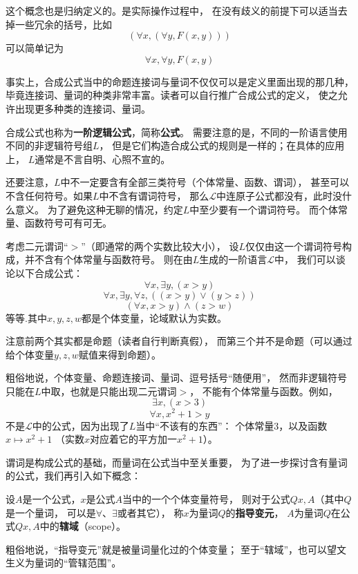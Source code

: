这个概念也是归纳定义的。是实际操作过程中，
在没有歧义的前提下可以适当去掉一些冗余的括号，比如
$$(\forall x,(\forall y,F(x,y)))$$
可以简单记为
$$\forall x,\forall y,F(x,y)$$

事实上，合成公式当中的命题连接词与量词不仅仅可以是定义里面出现的那几种，
毕竟连接词、量词的种类非常丰富。读者可以自行推广合成公式的定义，
使之允许出现更多种类的连接词、量词。


合成公式也称为\textbf{一阶逻辑公式}，简称\textbf{公式}。
需要注意的是，不同的一阶语言使用不同的非逻辑符号组$L$，
但是它们构造合成公式的规则是一样的；在具体的应用上，
$L$通常是不言自明、心照不宣的。

还要注意，$L$中不一定要含有全部三类符号（个体常量、函数、谓词），
甚至可以不含任何符号。如果$L$中不含有谓词符号，
那么$\mathcal{L}$中连原子公式都没有，此时没什么意义。
为了避免这种无聊的情况，约定$L$中至少要有一个谓词符号。
而个体常量、函数符号可有可无。

\begin{example}[一个简单的一阶语言系统]
\label{一个简单的一阶语言系统}
考虑二元谓词“$>$”（即通常的两个实数比较大小），
设$L$仅仅由这一个谓词符号构成，并不含有个体常量与函数符号。
则在由$L$生成的一阶语言$\mathcal{L}$中，
我们可以谈论以下合成公式：
$$\forall x,\exists y,(x>y)$$
$$\forall x,\exists y,\forall z,((x>y)\vee(y>z))$$
$$(\forall x,x>y)\wedge(z>w)$$
等等.其中$x,y,z,w$都是个体变量，论域默认为实数。

注意前两个其实都是命题（读者自行判断真假），
而第三个并不是命题（可以通过给个体变量$y,z,w$赋值来得到命题）。
\end{example}

粗俗地说，个体变量、命题连接词、量词、逗号括号“随便用”，
然而非逻辑符号只能在$L$中取，也就是只能出现二元谓词$>$，
不能有个体常量与函数。例如，
$$\exists x,(x>3)$$
$$\forall x, x^2+1>y$$
不是$\mathcal{L}$中的公式，因为出现了$L$当中“不该有的东西”：
个体常量$3$，以及函数$x\mapsto x^2+1$
（实数$x$对应着它的平方加一$x^2+1$）。\vs

谓词是构成公式的基础，而量词在公式当中至关重要，
为了进一步探讨含有量词的公式，我们再引入如下概念：

\begin{definition}[量词的辖域]
设$A$是一个公式，$x$是公式$A$当中的一个个体变量符号，
则对于公式$Qx,A$（其中$Q$是一个量词，
可以是$\forall$、$\exists$或者其它），
称$x$为量词$Q$的\textbf{指导变元}，
$A$为量词$Q$在公式$Qx,A$中的\textbf{辖域}（scope）。
\end{definition}

粗俗地说，“指导变元”就是被量词量化过的个体变量；
至于“辖域”，也可以望文生义为量词的“管辖范围”。

